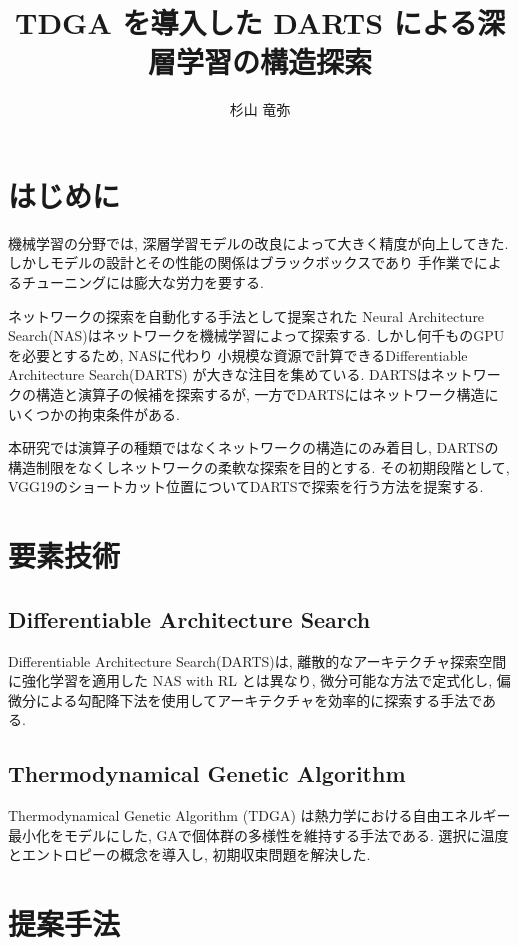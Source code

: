 \documentclass[a4paper,twoside,twocolumn,10pt]{article}
\title{TDGA を導入した DARTS による深層学習の構造探索}
\author{杉山 竜弥}
\begin{document}
\maketitle %
\small

\section{はじめに}
機械学習の分野では, 深層学習モデルの改良によって大きく精度が向上してきた.
しかしモデルの設計とその性能の関係はブラックボックスであり
手作業でによるチューニングには膨大な労力を要する.

ネットワークの探索を自動化する手法として提案された
Neural Architecture Search(NAS)はネットワークを機械学習によって探索する.
しかし何千ものGPUを必要とするため, NASに代わり
小規模な資源で計算できるDifferentiable Architecture Search(DARTS)
が大きな注目を集めている.
DARTSはネットワークの構造と演算子の候補を探索するが,
一方でDARTSにはネットワーク構造にいくつかの拘束条件がある.

本研究では演算子の種類ではなくネットワークの構造にのみ着目し,
DARTSの構造制限をなくしネットワークの柔軟な探索を目的とする.
その初期段階として, VGG19のショートカット位置についてDARTSで探索を行う方法を提案する.


\section{要素技術}

\subsection{Differentiable Architecture Search}
Differentiable Architecture Search(DARTS)\cite{DBLP:journals/corr/abs-1806-09055}は,
離散的なアーキテクチャ探索空間に強化学習を適用した NAS with RL とは異なり,
微分可能な方法で定式化し,
偏微分による勾配降下法を使用してアーキテクチャを効率的に探索する手法である.


\subsection{Thermodynamical Genetic Algorithm}
Thermodynamical Genetic Algorithm (TDGA) は熱力学における自由エネルギー最小化をモデルにした,
GAで個体群の多様性を維持する手法である.
選択に温度とエントロピーの概念を導入し, 初期収束問題を解決した.

\section{提案手法}
\end{document}
